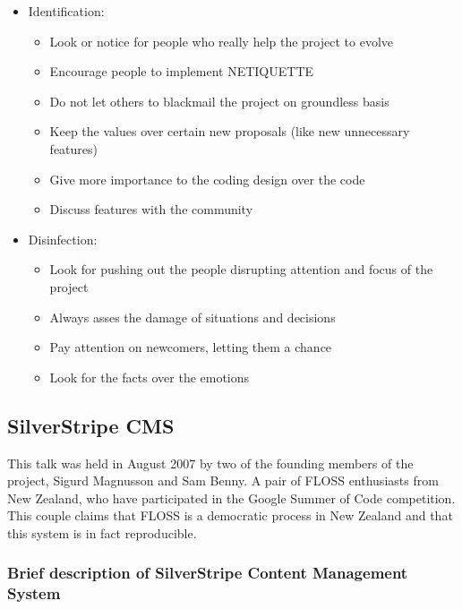 \documentclass[11pt]{article} %
\begin{document}
\begin{itemize}
  \item Identification:
  	\begin{itemize}
  		\item Look or notice for people who really help the project to evolve
  		\item Encourage people to implement NETIQUETTE
  		\item Do not let others to blackmail the project on groundless basis
  		\item Keep the values over certain new proposals (like new unnecessary features)
  		\item Give more importance to the coding design over the code
  		\item Discuss features with the community
  	\end{itemize}
  
  \item Disinfection:
  	\begin{itemize}
  		\item Look for pushing out the people disrupting attention and focus of the project
  		\item Always asses the damage of situations and decisions
  		\item Pay attention on newcomers, letting them a chance
  		\item Look for the facts over the emotions
  	\end{itemize}
    
\end{itemize}



\subsection{SilverStripe CMS}


This talk was held in August 2007 by two of the founding members of the project, Sigurd Magnusson and Sam Benny. A pair of FLOSS  enthusiasts from New Zealand, who have participated in the Google Summer of Code competition. This couple claims that FLOSS is a democratic process in New Zealand and that this system is in fact reproducible.

\subsubsection{Brief description of SilverStripe Content Management System}
\end{document}

